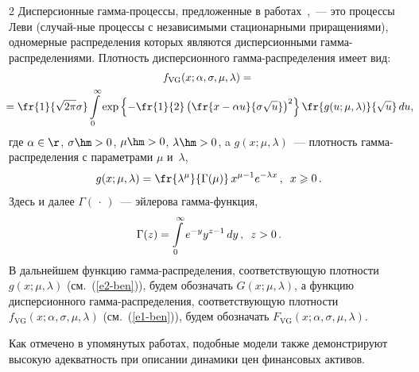\begin{multicols}{2}
Дисперсионные гамма-про\-цес\-сы, предложенные в работах~\cite{MadanSeneta1990, CarrMadanChang1998},~--- 
это процессы Леви
(слу\-чай-\linebreak ные процессы с независимыми стационарными приращениями),
одномерные распределения которых являются дисперсионными
гам\-ма-рас\-пре\-де\-ле\-ни\-ями. Плот\-ность дисперсионного гам\-ма-рас\-пре\-де\-ле\-ния
имеет вид:
\begin{multline}
f_{\mathrm{VG}}(x;\alpha,\sigma,\mu,\lambda)={}\\
\hspace*{-2mm}{}=\fr{1}{\sqrt{2\pi}\sigma}
\int\limits_{0}^{\infty}\exp\left\{-\fr{1}{2}\left(\fr{x-\alpha
u}{\sigma\sqrt{u}}\right)^2\right\}\fr{g(u;\mu,\lambda)}{\sqrt{u}}\,du,\!\!\!
\label{e1-ben}
\end{multline}
где $\alpha\in\r$, $\sigma\hm>0$, $\mu\hm>0$, $\lambda\hm>0$, a
$g(x;\mu,\lambda)$~--- плот\-ность гам\-ма-рас\-пре\-де\-ле\-ния с параметрами
$\mu$ и~$\lambda$,
\begin{equation}
g(x;\mu,\lambda)=\fr{\lambda^{\mu}}{\Gamma(\mu)}\,x^{\mu-1}e^{-\lambda
x}\,,\enskip x\geqslant0\,.\label{e2-ben}
\end{equation}
Здесь и далее $\Gamma(\,\cdot\,)$~--- эйлерова гам\-ма-функ\-ция,
$$
\Gamma(z) = \int\limits_{0}^{\infty}e^{-y}y^{z-1}\,dy\,,\enskip z>0\,.
$$
В дальнейшем функцию гамма-распределения, соответствующую плот\-ности
$g(x;\mu,\lambda)$ (см.~(\ref{e2-ben})), будем обозначать $G(x;\mu,\lambda)$, а
функцию дисперсионного гам\-ма-рас\-пре\-де\-ле\-ния, соответствующую
плотности $f_{\mathrm{VG}}(x;\alpha,\sigma,\mu,\lambda)$ (см.~(\ref{e1-ben})), будем
обозначать $F_{\mathrm{VG}}(x;\alpha,\sigma,\mu,\lambda)$.

Как отмечено в упомянутых работах, подобные модели также
демонстрируют высокую адекватность при описании динамики цен
финансовых активов.


\end{multicols}
